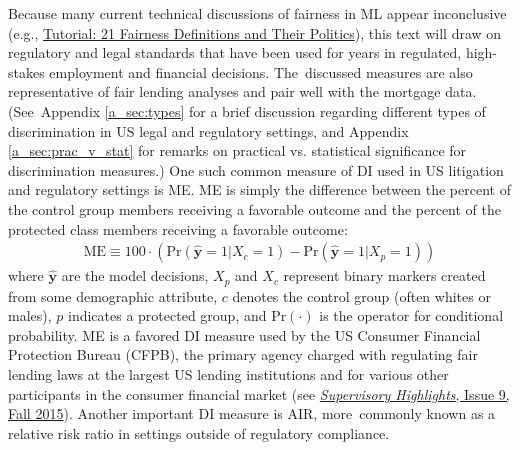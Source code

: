 \documentclass[information,article,accept,moreauthors,pdftex]{Definitions/mdpi}
\begin{document}
Because many current technical discussions of fairness in ML appear inconclusive (e.g., 
\href{https://www.youtube.com/watch?v=jIXIuYdnyyk}{Tutorial: 21 Fairness Definitions and Their Politics}), this text will draw on regulatory and legal standards that have been used for years in regulated, high-stakes employment and financial decisions. The~discussed measures are also representative of fair lending analyses and pair well with the mortgage data. (See~Appendix \ref{a_sec:types} for a brief discussion regarding different types of discrimination in US legal and regulatory settings, and Appendix \ref{a_sec:prac_v_stat} for remarks on practical vs. statistical significance for discrimination measures.) One such common measure of DI used in US litigation and regulatory settings is ME. ME is simply the difference between the percent of the control group members receiving a favorable outcome and the percent of the protected class members receiving a favorable outcome: 
\begin{equation}
\label{eq:me}
\begin{aligned}
\text{ME} \equiv 100 \cdot (\text{Pr}(\hat{\mathbf{y}} = 1| X_c = 1)  - \text{Pr}(\hat{\mathbf{y}} = 1 | X_p = 1))
\end{aligned}
\end{equation}
 where $\hat{\mathbf{y}}$ are the model decisions, $X_p$ and $X_c$ represent binary markers created from some demographic attribute, $c$ denotes the control group (often whites or males), $p$ indicates a protected group, and $\text{Pr}(\cdot)$ is the operator for conditional probability.  ME is a favored DI measure used by the US Consumer Financial Protection Bureau (CFPB), the primary agency charged with regulating fair lending laws at the largest US lending institutions and for various other participants in the consumer financial market (see  
\href{https://files.consumerfinance.gov/f/201510_cfpb_supervisory-highlights.pdf}
{\textit{Supervisory Highlights}, Issue 9, Fall 2015}).
 Another important DI measure is AIR, more~commonly known as a relative risk ratio in settings outside of regulatory compliance.
\end{document}
